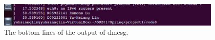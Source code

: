 \documentclass[twoside, 11pt, tablecaption=bottom]{article}
\begin{document}

\begin{figure}
\centering
\includegraphics[width = 15 cm]{dmesg}
\caption{The bottom lines of the output of dmesg.}
\label{fig:dmesg}
\end{figure}






\vskip 0.2in
%
\end{document}

